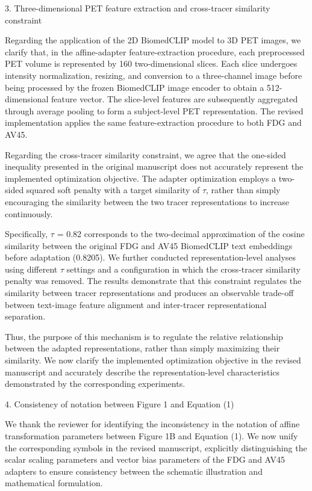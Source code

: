 {3. Three-dimensional PET feature extraction and cross-tracer similarity constraint

Regarding the application of the 2D BiomedCLIP model to 3D PET images, we clarify that, in the affine-adapter feature-extraction procedure, each preprocessed PET volume is represented by 160 two-dimensional slices. Each slice undergoes intensity normalization, resizing, and conversion to a three-channel image before being processed by the frozen BiomedCLIP image encoder to obtain a 512-dimensional feature vector. The slice-level features are subsequently aggregated through average pooling to form a subject-level PET representation. The revised implementation applies the same feature-extraction procedure to both FDG and AV45.

Regarding the cross-tracer similarity constraint, we agree that the one-sided inequality presented in the original manuscript does not accurately represent the implemented optimization objective. The adapter optimization employs a two-sided squared soft penalty with a target similarity of \ensuremath{\tau}, rather than simply encouraging the similarity between the two tracer representations to increase continuously.

Specifically, \ensuremath{\tau} = 0.82 corresponds to the two-decimal approximation of the cosine similarity between the original FDG and AV45 BiomedCLIP text embeddings before adaptation (0.8205). We further conducted representation-level analyses using different \ensuremath{\tau} settings and a configuration in which the cross-tracer similarity penalty was removed. The results demonstrate that this constraint regulates the similarity between tracer representations and produces an observable trade-off between text-image feature alignment and inter-tracer representational separation.

Thus, the purpose of this mechanism is to regulate the relative relationship between the adapted representations, rather than simply maximizing their similarity. We now clarify the implemented optimization objective in the revised manuscript and accurately describe the representation-level characteristics demonstrated by the corresponding experiments.

4. Consistency of notation between Figure 1 and Equation (1)

We thank the reviewer for identifying the inconsistency in the notation of affine transformation parameters between Figure 1B and Equation (1). We now unify the corresponding symbols in the revised manuscript, explicitly distinguishing the scalar scaling parameters and vector bias parameters of the FDG and AV45 adapters to ensure consistency between the schematic illustration and mathematical formulation.

}

